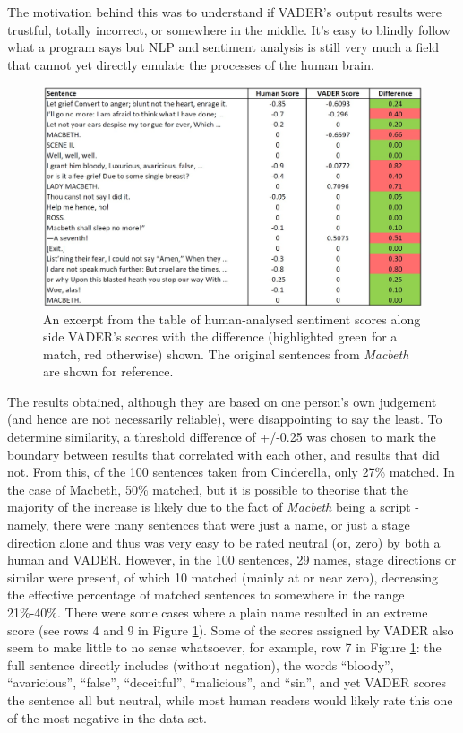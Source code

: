 \documentclass{article}
\begin{document}
{        The motivation behind this was to understand if VADER's output results were trustful, totally incorrect, or somewhere in the middle. It's easy to blindly follow what a program says but NLP and sentiment analysis is still very much a field that cannot yet directly emulate the processes of the human brain.
    
        \begin{figure}[hbtp]
            \includegraphics[width=1\textwidth]{Figures/HandAnalysis/Macbeth}
            \centering
            \caption{An excerpt from the table of human-analysed sentiment scores along side VADER's scores with the difference (highlighted green for a match, red otherwise) shown. The original sentences from \textit{Macbeth} are shown for reference.}
            \label{fig:handMacbeth}
        \end{figure}
        
        The results obtained, although they are based on one person's own judgement (and hence are not necessarily reliable), were disappointing to say the least. To determine similarity, a threshold difference of +/-0.25 was chosen to mark the boundary between results that correlated with each other, and results that did not. From this, of the 100 sentences taken from Cinderella, only 27\% matched. In the case of Macbeth, 50\% matched, but it is possible to theorise that the majority of the increase is likely due to the fact of \textit{Macbeth} being a script - namely, there were many sentences that were just a name, or just a stage direction alone and thus was very easy to be rated neutral (or, zero) by both a human and VADER. However, in the 100 sentences, 29 names, stage directions or similar were present, of which 10 matched (mainly at or near zero), decreasing the effective percentage of matched sentences to somewhere in the range 21\%-40\%. There were some cases where a plain name resulted in an extreme score (see rows 4 and 9 in Figure \ref{fig:handMacbeth}). Some of the scores assigned by VADER also seem to make little to no sense whatsoever, for example, row 7 in Figure \ref{fig:handMacbeth}: the full sentence directly includes (without negation), the words ``bloody'', ``avaricious'', ``false'', ``deceitful'', ``malicious'', and ``sin'', and yet VADER scores the sentence all but neutral, while most human readers would likely rate this one of the most negative in the data set.

}
\end{document}
